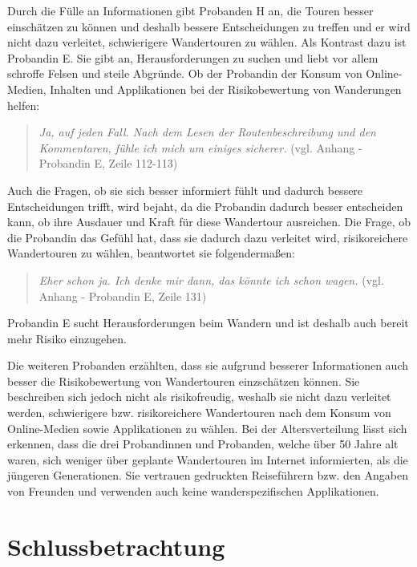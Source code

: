 Durch die Fülle an Informationen gibt Probanden H an, die Touren besser einschätzen zu können und deshalb bessere Entscheidungen zu treffen und er wird nicht dazu verleitet, schwierigere Wandertouren zu wählen. Als Kontrast dazu ist Probandin E. Sie gibt an, Herausforderungen zu suchen und liebt vor allem schroffe Felsen und steile Abgründe. Ob der Probandin der Konsum von Online-Medien, Inhalten und Applikationen bei der Risikobewertung von Wanderungen helfen:

\begin{quote}
	\textit{\glqq Ja, auf jeden Fall. Nach dem Lesen der Routenbeschreibung und den Kommentaren, fühle ich mich um einiges sicherer.\grqq} (vgl. Anhang - Probandin E, Zeile 112-113)
\end{quote}

Auch die Fragen, ob sie sich besser informiert fühlt und dadurch bessere Entscheidungen trifft, wird bejaht, da die Probandin dadurch besser entscheiden kann, ob ihre Ausdauer und Kraft für diese Wandertour ausreichen. Die Frage, ob die Probandin das Gefühl hat, dass sie dadurch dazu verleitet wird, risikoreichere Wandertouren zu wählen, beantwortet sie folgendermaßen:

\begin{quote}
	\textit{\glqq Eher schon ja. Ich denke mir dann, das könnte ich schon wagen.\grqq} (vgl. Anhang - Probandin E, Zeile 131)
\end{quote}

Probandin E sucht Herausforderungen beim Wandern und ist deshalb auch bereit mehr Risiko einzugehen.

Die weiteren Probanden erzählten, dass sie aufgrund besserer Informationen auch besser die Risikobewertung von Wandertouren einzschätzen können. Sie beschreiben sich jedoch nicht als risikofreudig, weshalb sie nicht dazu verleitet werden, schwierigere bzw. risikoreichere Wandertouren nach dem Konsum von Online-Medien sowie Applikationen zu wählen. Bei der Altersverteilung lässt sich erkennen, dass die drei Probandinnen und Probanden, welche über 50 Jahre alt waren, sich weniger über geplante Wandertouren im Internet informierten, als die jüngeren Generationen. Sie vertrauen gedruckten Reiseführern bzw. den Angaben von Freunden und verwenden auch keine wanderspezifischen Applikationen.





\chapter{Schlussbetrachtung}

